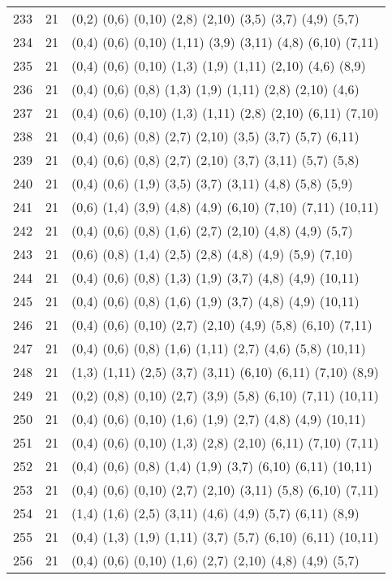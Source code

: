 {\begin{longtable}{lll}
233 & 21 & (0,2) (0,6) (0,10) (2,8) (2,10) (3,5) (3,7) (4,9) (5,7) \\
234 & 21 & (0,4) (0,6) (0,10) (1,11) (3,9) (3,11) (4,8) (6,10) (7,11) \\
235 & 21 & (0,4) (0,6) (0,10) (1,3) (1,9) (1,11) (2,10) (4,6) (8,9) \\
236 & 21 & (0,4) (0,6) (0,8) (1,3) (1,9) (1,11) (2,8) (2,10) (4,6) \\
237 & 21 & (0,4) (0,6) (0,10) (1,3) (1,11) (2,8) (2,10) (6,11) (7,10) \\
238 & 21 & (0,4) (0,6) (0,8) (2,7) (2,10) (3,5) (3,7) (5,7) (6,11) \\
239 & 21 & (0,4) (0,6) (0,8) (2,7) (2,10) (3,7) (3,11) (5,7) (5,8) \\
240 & 21 & (0,4) (0,6) (1,9) (3,5) (3,7) (3,11) (4,8) (5,8) (5,9) \\
241 & 21 & (0,6) (1,4) (3,9) (4,8) (4,9) (6,10) (7,10) (7,11) (10,11) \\
242 & 21 & (0,4) (0,6) (0,8) (1,6) (2,7) (2,10) (4,8) (4,9) (5,7) \\
243 & 21 & (0,6) (0,8) (1,4) (2,5) (2,8) (4,8) (4,9) (5,9) (7,10) \\
244 & 21 & (0,4) (0,6) (0,8) (1,3) (1,9) (3,7) (4,8) (4,9) (10,11) \\
245 & 21 & (0,4) (0,6) (0,8) (1,6) (1,9) (3,7) (4,8) (4,9) (10,11) \\
246 & 21 & (0,4) (0,6) (0,10) (2,7) (2,10) (4,9) (5,8) (6,10) (7,11) \\
247 & 21 & (0,4) (0,6) (0,8) (1,6) (1,11) (2,7) (4,6) (5,8) (10,11) \\
248 & 21 & (1,3) (1,11) (2,5) (3,7) (3,11) (6,10) (6,11) (7,10) (8,9) \\
249 & 21 & (0,2) (0,8) (0,10) (2,7) (3,9) (5,8) (6,10) (7,11) (10,11) \\
250 & 21 & (0,4) (0,6) (0,10) (1,6) (1,9) (2,7) (4,8) (4,9) (10,11) \\
251 & 21 & (0,4) (0,6) (0,10) (1,3) (2,8) (2,10) (6,11) (7,10) (7,11) \\
252 & 21 & (0,4) (0,6) (0,8) (1,4) (1,9) (3,7) (6,10) (6,11) (10,11) \\
253 & 21 & (0,4) (0,6) (0,10) (2,7) (2,10) (3,11) (5,8) (6,10) (7,11) \\
254 & 21 & (1,4) (1,6) (2,5) (3,11) (4,6) (4,9) (5,7) (6,11) (8,9) \\
255 & 21 & (0,4) (1,3) (1,9) (1,11) (3,7) (5,7) (6,10) (6,11) (10,11) \\
256 & 21 & (0,4) (0,6) (0,10) (1,6) (2,7) (2,10) (4,8) (4,9) (5,7) \\

\end{longtable}}
